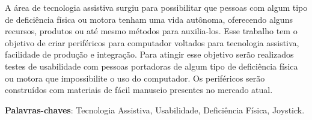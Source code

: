 \documentclass[
	12pt,			%
	openright,		%
	oneside,			%
	a4paper,			%
	chapter=TITLE,		%
	english,			%
	brazil,			%
	]{abntex2}
\begin{document}

%
%
%
%



\begin{resumo}
	A área de tecnologia assistiva surgiu para possibilitar que pessoas com algum tipo de deficiência física ou motora tenham uma vida autônoma, oferecendo	alguns recursos, produtos ou até mesmo métodos para auxilia-los. Esse trabalho tem o objetivo de criar periféricos para computador voltados para tecnologia assistiva, facilidade de produção e integração. Para atingir esse objetivo serão realizados testes de usabilidade com pessoas portadoras de algum tipo de deficiência física ou motora que impossibilite o uso do computador. Os periféricos serão construídos com materiais de fácil manuseio presentes no mercado atual.

 \vspace{\onelineskip}
    
 \noindent
 \textbf{Palavras-chaves}: Tecnologia Assistiva, Usabilidade, Deficiência Física, Joystick.
\end{resumo}
\end{document}
